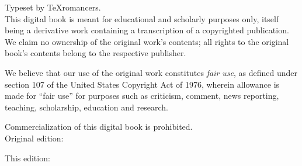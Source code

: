\documentclass[../main]{subfiles}
\begin{document}

\newpage
\thispagestyle{empty}

\phantom{.}

\vfill

Typeset by \TeX{}romancers. \\[1em]

This digital book is meant for educational and scholarly purposes only, itself being a derivative work containing a transcription of a copyrighted publication. We claim no ownership of the original work's contents; all rights to the original book's contents belong to the respective publisher.

\medskip

We believe that our use of the original work constitutes \emph{fair use}, as defined under section 107 of the United States Copyright Act of 1976, wherein allowance is made for ``fair use'' for purposes such as criticism, comment, news reporting, teaching, scholarship, education and research.

\medskip

Commercialization of this digital book is prohibited.\\[1em]

Original edition: \bookoriginaledition

This edition: \bookthisedition
\end{document}
